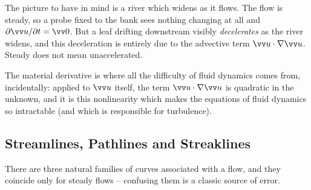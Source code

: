 \begin{center}
\end{center}

The picture to have in mind is a river which widens as it flows. The flow is steady, so a probe fixed to the bank sees nothing changing at all and $\partial \vv u/\partial t = \vv 0$. But a leaf drifting downstream visibly \emph{decelerates} as the river widens, and this deceleration is entirely due to the advective term $\vv u \cdot \nabla \vv u$. Steady does not mean unaccelerated.

The material derivative is where all the difficulty of fluid dynamics comes from, incidentally: applied to $\vv u$ itself, the term $\vv u \cdot \nabla \vv u$ is quadratic in the unknown, and it is this nonlinearity which makes the equations of fluid dynamics so intractable (and which is responsible for turbulence).

\subsection{Streamlines, Pathlines and Streaklines}

There are three natural families of curves associated with a flow, and they coincide only for steady flows -- confusing them is a classic source of error.

